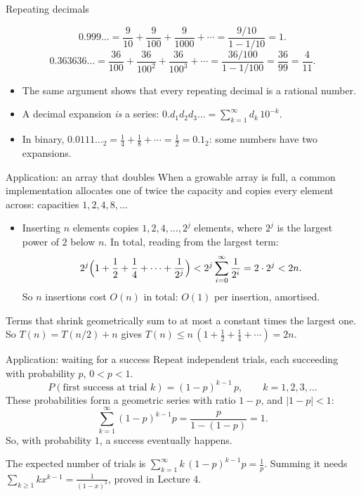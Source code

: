 \documentclass{wosm-slides}
\begin{document}
\begin{frame}{Repeating decimals}
  \begin{example}
    \[ 0.999\ldots = \frac{9}{10} + \frac{9}{100} + \frac{9}{1000} + \cdots
       = \frac{9/10}{1 - 1/10} = 1 . \]
    \pause
    \[ 0.363636\ldots = \frac{36}{100} + \frac{36}{100^2} + \frac{36}{100^3} + \cdots
       = \frac{36/100}{1 - 1/100} = \frac{36}{99} = \frac{4}{11} . \]
  \end{example}
  \pause
  \begin{itemize}
    \item The same argument shows that every repeating decimal is a rational number.
    \item A decimal expansion \emph{is} a series:
      $0.d_1 d_2 d_3\ldots = \sum_{k=1}^\infty d_k\,10^{-k}$.
    \item In binary, $0.0111\ldots_2 = \frac14 + \frac18 + \cdots = \frac12 = 0.1_2$:
      some numbers have two expansions.
  \end{itemize}
\end{frame}

\begin{frame}{Application: an array that doubles}
  When a growable array is full, a common implementation allocates one of twice the
  capacity and copies every element across: capacities $1, 2, 4, 8, \dots$
  \begin{itemize}
    \item Inserting $n$ elements copies $1, 2, 4, \dots, 2^j$ elements, where $2^j$ is the
      largest power of $2$ below $n$. In total, reading from the largest term:
      \[ 2^j \Bigl(1 + \frac12 + \frac14 + \dots + \frac1{2^j}\Bigr)
         < 2^j \sum_{i=0}^{\infty} \frac{1}{2^i} = 2 \cdot 2^j < 2n . \]
      So $n$ insertions cost $O(n)$ in total: $O(1)$ per insertion, amortised.
  \end{itemize}
  \pause
  \begin{remark}
    Terms that shrink geometrically sum to at most a constant times the largest one.
    So $T(n) = T(n/2) + n$ gives $T(n) \le n\,(1 + \frac12 + \frac14 + \cdots) = 2n$.
  \end{remark}
\end{frame}

\begin{frame}{Application: waiting for a success}
  Repeat independent trials, each succeeding with probability $p$, $0 < p < 1$.
  \[ P(\text{first success at trial } k) = (1-p)^{k-1}\, p , \qquad k = 1, 2, 3, \dots \]
  \pause
  These probabilities form a geometric series with ratio $1 - p$, and $|1-p| < 1$:
  \[ \sum_{k=1}^{\infty} (1-p)^{k-1} p = \frac{p}{1 - (1-p)} = 1 . \]
  So, with probability $1$, a success eventually happens.
  \pause
  \begin{remark}
    The expected number of trials is $\sum_{k=1}^\infty k\,(1-p)^{k-1} p = \frac1p$.
    Summing it needs $\sum_{k \ge 1} k x^{k-1} = \frac{1}{(1-x)^2}$, proved in Lecture 4.
  \end{remark}
\end{frame}
\end{document}
